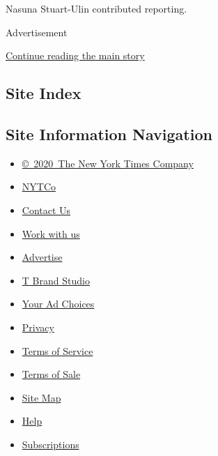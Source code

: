 Nasuna Stuart-Ulin contributed reporting.

Advertisement

\protect\hyperlink{after-bottom}{Continue reading the main story}

\hypertarget{site-index}{%
\subsection{Site Index}\label{site-index}}

\hypertarget{site-information-navigation}{%
\subsection{Site Information
Navigation}\label{site-information-navigation}}

\begin{itemize}
\tightlist
\item
  \href{https://help.nytimes3xbfgragh.onion/hc/en-us/articles/115014792127-Copyright-notice}{©~2020~The
  New York Times Company}
\end{itemize}

\begin{itemize}
\tightlist
\item
  \href{https://www.nytco.com/}{NYTCo}
\item
  \href{https://help.nytimes3xbfgragh.onion/hc/en-us/articles/115015385887-Contact-Us}{Contact
  Us}
\item
  \href{https://www.nytco.com/careers/}{Work with us}
\item
  \href{https://nytmediakit.com/}{Advertise}
\item
  \href{http://www.tbrandstudio.com/}{T Brand Studio}
\item
  \href{https://www.nytimes3xbfgragh.onion/privacy/cookie-policy\#how-do-i-manage-trackers}{Your
  Ad Choices}
\item
  \href{https://www.nytimes3xbfgragh.onion/privacy}{Privacy}
\item
  \href{https://help.nytimes3xbfgragh.onion/hc/en-us/articles/115014893428-Terms-of-service}{Terms
  of Service}
\item
  \href{https://help.nytimes3xbfgragh.onion/hc/en-us/articles/115014893968-Terms-of-sale}{Terms
  of Sale}
\item
  \href{https://spiderbites.nytimes3xbfgragh.onion}{Site Map}
\item
  \href{https://help.nytimes3xbfgragh.onion/hc/en-us}{Help}
\item
  \href{https://www.nytimes3xbfgragh.onion/subscription?campaignId=37WXW}{Subscriptions}
\end{itemize}
